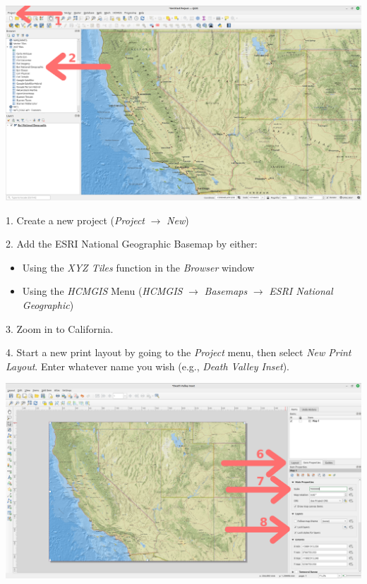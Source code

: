 \documentclass[oneside,a4paper,11pt,explicit]{book}
\begin{document}
\centerline{\includegraphics[width=\textwidth]{Basemap.png}}

1. Create a new project (\textit{Project} $\rightarrow$ \textit{New})

\begin{singlespace}
2. Add the ESRI National Geographic Basemap by either:
	\begin{itemize}
		\item Using the \textit{XYZ Tiles} function in the \textit{Browser} window
		\item Using the \textit{HCMGIS} Menu (\textit{HCMGIS} $\rightarrow$ \textit{Basemaps} $\rightarrow$ \textit{ESRI National Geographic})
	\end{itemize}
\end{singlespace}

3. Zoom in to California.

4. Start a new print layout by going to the \textit{Project} menu, then select \textit{New Print Layout}. Enter whatever name you wish (e.g., \textit{Death Valley Inset}).


\centerline{\includegraphics[width=\textwidth]{InsetItem.png}}
\end{document}
